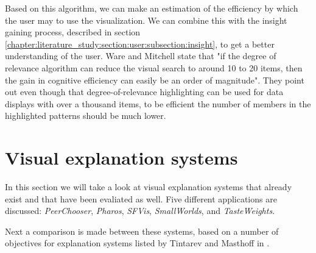 Based on this algorithm, we can make an estimation of the efficiency by which the user may to use the visualization. We can combine this with the insight gaining process, described in section \ref{chapter:literature_study:section:user:subsection:insight}, to get a better understanding of the user. Ware and Mitchell state that "if the degree of relevance algorithm can reduce the visual search to around 10 to 20 items, then the gain in cognitive efficiency can easily be an order of magnitude"\cite{ware:2004}. They point out even though that degree-of-relevance highlighting can be used for data displays with over a thousand items, to be efficient the number of members in the highlighted patterns should be much lower\cite{ware:2004}.


































% 
\section{Visual explanation systems}\label{chapter:literature_study:section:applications}

In this section we will take a look at visual explanation systems that already exist and that have been evaliated as well. Five different applications are discussed: \emph{PeerChooser}, \emph{Pharos}, \emph{SFVis}, \emph{SmallWorlds}, and \emph{TasteWeights}.

Next a comparison is made between these systems, based on a number of objectives for explanation systems listed by Tintarev and Masthoff in \cite{tintarev:2007:SER:1547550.1547664}.



